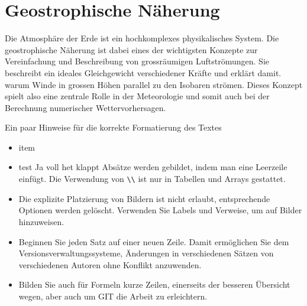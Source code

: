 %
%
%
%
\chapter{Geostrophische Näherung\label{chapter:geostrophisch}}
\begin{refsection}

Die Atmosphäre der Erde ist ein hochkomplexes physikalisches System.
Die geostrophische Näherung ist dabei eines der wichtigsten Konzepte zur Vereinfachung und Beschreibung von grossräumigen Luftströmungen.
Sie beschreibt ein ideales Gleichgewicht verschiedener Kräfte und erklärt damit. warum Winde in grossen Höhen parallel zu den Isobaren strömen. 
Dieses Konzept spielt also eine zentrale Rolle in der Meteorologie und somit auch bei der Berechnung numerischer Wettervorhersagen.


Ein paar Hinweise für die korrekte Formatierung des Textes
\begin{itemize}
\item
item
\item
test Ja voll het klappt 
Absätze werden gebildet, indem man eine Leerzeile einfügt.
Die Verwendung von \verb+\\+ ist nur in Tabellen und Arrays gestattet.
\item
Die explizite Platzierung von Bildern ist nicht erlaubt, entsprechende
Optionen werden gelöscht. 
Verwenden Sie Labels und Verweise, um auf Bilder hinzuweisen.
\item
Beginnen Sie jeden Satz auf einer neuen Zeile. 
Damit ermöglichen Sie dem Versionsverwaltungssysteme, Änderungen
in verschiedenen Sätzen von verschiedenen Autoren ohne Konflikt 
anzuwenden.
\item 
Bilden Sie auch für Formeln kurze Zeilen, einerseits der besseren
Übersicht wegen, aber auch um GIT die Arbeit zu erleichtern.
\end{itemize}






\printbibliography[heading=subbibliography]
\end{refsection}
